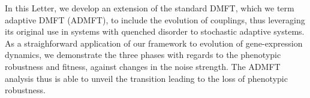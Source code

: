 \documentclass[%
 reprint,
superscriptaddress,
 amsmath,amssymb,
 prl,
]{revtex4-2}
\begin{document}


In this  Letter, we develop an extension of the standard DMFT,  which we term adaptive DMFT (ADMFT), to include the evolution of couplings, thus leveraging its original use in systems with quenched
disorder to stochastic adaptive systems.  As a straighforward application of our  framework  to evolution of gene-expression dynamics, we demonstrate the three phases with regards to the phenotypic robustness and fitness, against  changes in the noise strength. The  ADMFT analysis thus is able to unveil the transition  leading to the loss of phenotypic robustness. %
 
\end{document}
